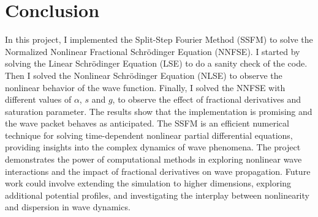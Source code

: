 \documentclass[8pt, a4paper, twocolumn]{article}
\begin{document}
\section{Conclusion}

In this project, I implemented the Split-Step Fourier Method (SSFM) to solve the Normalized Nonlinear Fractional
Schrödinger Equation (NNFSE). I started by solving the Linear Schrödinger Equation (LSE) to do a sanity check of the code.
Then I solved the Nonlinear Schrödinger Equation (NLSE) to observe the nonlinear behavior of the wave function. Finally, I solved
the NNFSE with different values of $\alpha$, $s$ and $g$, to observe the effect of fractional derivatives and saturation parameter.
The results show that the implementation is promising and the wave packet behaves as anticipated. The SSFM is an efficient
numerical technique for solving time-dependent nonlinear partial differential equations, providing insights into the
complex dynamics of wave phenomena. The project demonstrates the power of computational methods in exploring
nonlinear wave interactions and the impact of fractional derivatives on wave propagation. Future work could involve
extending the simulation to higher dimensions, exploring additional potential profiles, and investigating the
interplay between nonlinearity and dispersion in wave dynamics.



\end{document}
